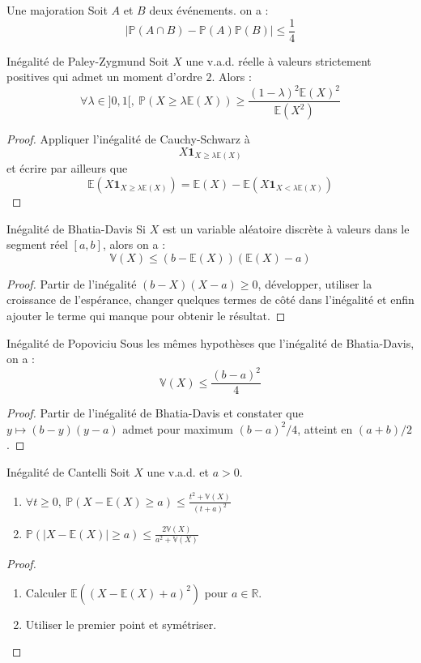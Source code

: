 \documentclass[french]{article}
\renewcommand{\P}{\mathbb{P}}
\newcommand{\R}{\mathbb{R}}
\newcommand{\E}{\mathbb{E}}
\newcommand{\V}{\mathbb{V}}
\theoremstyle{definition}
\begin{document}
\begin{lem}{Une majoration}
	Soit $A$ et $B$ deux événements. on a : $$\lvert\P(A\cap B)-\P(A)\P(B)\rvert\leqslant\frac{1}{4}$$
\end{lem}

\begin{lem}{Inégalité de Paley-Zygmund}
	Soit $X$ une v.a.d. réelle à valeurs strictement positives qui admet un moment d'ordre $2$. Alors : $$\forall \lambda\in]0,1[,\ \P(X\geqslant\lambda\E(X))\geqslant\frac{(1-\lambda)^2\E(X)^2}{\E(X^2)}$$
\end{lem}
\begin{proof}
	Appliquer l'inégalité de Cauchy-Schwarz à $$X\mathbf{1}_{X\geqslant\lambda\E(X)}$$ et écrire par ailleurs que $$\E(X\mathbf{1}_{X\geqslant\lambda\E(X)})=\E(X)-\E(X\mathbf{1}_{X<\lambda\E(X)})$$
\end{proof}

\begin{lem}{Inégalité de Bhatia-Davis}
	Si $X$ est un variable aléatoire discrète à valeurs dans le segment réel $[a,b]$, alors on a : $$\V(X)\leqslant (b-\E(X))(\E(X)-a)$$
\end{lem}
\begin{proof}
	Partir de l'inégalité $(b-X)(X-a)\geqslant0$, développer, utiliser la croissance de l'espérance, changer quelques termes de côté dans l'inégalité et enfin ajouter le terme qui manque pour obtenir le résultat.
\end{proof}

\begin{lem}{Inégalité de Popoviciu}
	Sous les mêmes hypothèses que l'inégalité de Bhatia-Davis, on a : $$\V(X)\leqslant\frac{(b-a)^2}{4}$$
\end{lem}
\begin{proof}
	Partir de l'inégalité de Bhatia-Davis et constater que $y\mapsto (b-y)(y-a)$ admet pour maximum $(b-a)^2/4$, atteint en $(a+b)/2$.
\end{proof}

\begin{lem}{Inégalité de Cantelli}
	Soit $X$ une v.a.d. et $a>0$.
	\begin{enumerate}
		\item $\forall t\geqslant0,\ \P(X-\E(X)\geqslant a)\leqslant\displaystyle\frac{t^2+\V(X)}{(t+a)^2}$
		\item $\P(\lvert X-\E(X)\rvert\geqslant a)\leqslant\displaystyle\frac{2\V(X)}{a^2+\V(X)}$
	\end{enumerate}
\end{lem}
\begin{proof}
	\begin{enumerate}
		\item Calculer $\E((X-\E(X)+a)^2)$ pour $a\in\R$.
		\item Utiliser le premier point et symétriser.
	\end{enumerate}
\end{proof}
\end{document}
